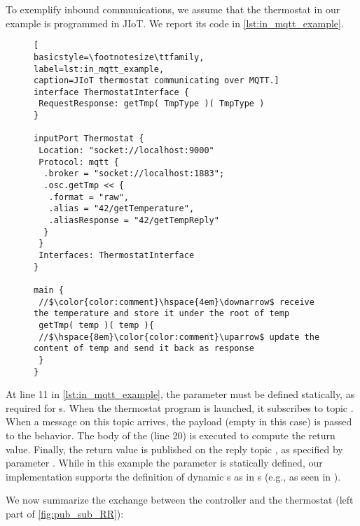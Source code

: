 To exemplify inbound  communications, we assume that the
thermostat in our example is programmed in JIoT. We report its code in
\cref{lst:in_mqtt_example}.

\begin{figure}[t]
\begin{lstlisting}[
basicstyle=\footnotesize\ttfamily,
label=lst:in_mqtt_example,
caption=JIoT thermostat communicating over MQTT.]
interface ThermostatInterface {
 RequestResponse: getTmp( TmpType )( TmpType )
}

inputPort Thermostat {
 Location: "socket://localhost:9000"
 Protocol: mqtt {
  .broker = "socket://localhost:1883";
  .osc.getTmp << {
   .format = "raw",
   .alias = "42/getTemperature",
   .aliasResponse = "42/getTempReply"
  }
 }
 Interfaces: ThermostatInterface 
}

main {
 //$\color{color:comment}\hspace{4em}\downarrow$ receive the temperature and store it under the root of temp
 getTmp( temp )( temp ){
 //$\hspace{8em}\color{color:comment}\uparrow$ update the content of temp and send it back as response 
 }
}
\end{lstlisting}
\end{figure}

At line 11 in \cref{lst:in_mqtt_example}, the  parameter
must be defined statically, as required for s.
When the thermostat program is launched, it subscribes to topic
. When a message on this topic arrives, the payload
(empty in this case) is passed to the behavior. The body of the
 (line 20) is executed to compute the return value.
Finally, the return value is published on the reply topic
, as specified by  parameter
. While in this example the parameter
 is statically defined, our implementation supports the
definition of dynamic s as in s (e.g.,
as seen in ).

We now summarize the exchange between the controller and the thermostat (left
part of \cref{fig:pub_sub_RR}):

